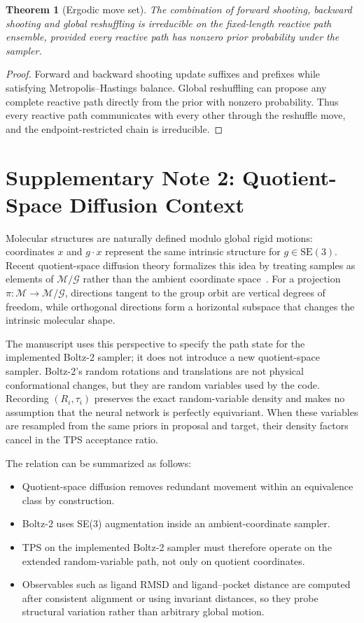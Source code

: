 \documentclass[11pt,a4paper]{article}
\newtheorem{theorem}{Theorem}
\begin{document}
\begin{theorem}[Ergodic move set]
The combination of forward shooting, backward shooting and global reshuffling
is irreducible on the fixed-length reactive path ensemble, provided every
reactive path has nonzero prior probability under the sampler.
\end{theorem}
\begin{proof}
Forward and backward shooting update suffixes and prefixes while satisfying
Metropolis--Hastings balance. Global reshuffling can propose any complete
reactive path directly from the prior with nonzero probability. Thus every
reactive path communicates with every other through the reshuffle move, and
the endpoint-restricted chain is irreducible.
\end{proof}

\section{Supplementary Note 2: Quotient-Space Diffusion Context}
\label{sec:quotient}

Molecular structures are naturally defined modulo global rigid motions:
coordinates $x$ and $g\cdot x$ represent the same intrinsic structure for
$g\in \mathrm{SE}(3)$. Recent quotient-space diffusion theory formalizes this
idea by treating samples as elements of $\mathcal{M}/\mathcal{G}$ rather than
the ambient coordinate space~\cite{xu2026}. For a projection
$\pi:\mathcal{M}\rightarrow\mathcal{M}/\mathcal{G}$, directions tangent to the
group orbit are vertical degrees of freedom, while orthogonal directions form
a horizontal subspace that changes the intrinsic molecular shape.

The manuscript uses this perspective to specify the path state for the
implemented Boltz-2 sampler; it does not introduce a new quotient-space
sampler. Boltz-2's random rotations and translations are not physical
conformational changes, but they are random variables used by the code.
Recording $(R_i,\tau_i)$ preserves the exact random-variable density and makes
no assumption that the neural network is perfectly equivariant. When these
variables are resampled from the same priors in proposal and target, their
density factors cancel in the TPS acceptance ratio.

The relation can be summarized as follows:
\begin{itemize}[leftmargin=*]
  \item Quotient-space diffusion removes redundant movement within an
  equivalence class by construction.
  \item Boltz-2 uses SE(3) augmentation inside an ambient-coordinate sampler.
  \item TPS on the implemented Boltz-2 sampler must therefore operate on the
  extended random-variable path, not only on quotient coordinates.
  \item Observables such as ligand RMSD and ligand--pocket distance are
  computed after consistent alignment or using invariant distances, so they
  probe structural variation rather than arbitrary global motion.
\end{itemize}
\end{document}
